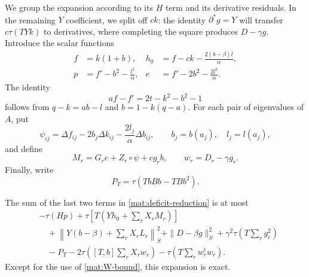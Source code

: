 We group the expansion according to its $H$ term and its derivative
residuals.  In the remaining $Y$ coefficient, we
split off $ck$: the identity $\partial^*g=Y$ will transfer
$c\tau(TYk)$ to derivatives, where completing the square produces
$D-\gamma g$.  Introduce the scalar functions
\begin{equation}\label{mat:scalar-functions}
 \begin{aligned}
 f&=k(1+b),&
 h_0&=f-ck-\frac{2(b-\beta)l}{\alpha},\\
 p&=f'-b^2-\frac{l^2}{\alpha},&
 e&=f'-2b^2-\frac{2l^2}{\alpha}.
 \end{aligned}
\end{equation}
The identity
\[
 af-f'=2t-k^2-b^2-1
\]
follows from $q-k=ab-l$ and $b=1-k(q-a)$.
For each pair of eigenvalues of $A$, put
\[
 \psi_{ij}=\Delta f_{ij}-2b_j\Delta k_{ij}
                         -\frac{2l_j}{\alpha}\Delta b_{ij},
 \qquad b_j=b(a_j),\quad l_j=l(a_j),
\]
and define
\begin{equation}\label{mat:M-w}
 M_r=G_re+Z_r\circ\psi+cg_rb,\qquad w_r=D_r-\gamma g_r.
\end{equation}
Finally, write
\begin{equation}\label{mat:P-definition}
 P_T=\tau(TbBb-TBb^2).
\end{equation}

\begin{lemma}\label{mat:expansion}
The sum of the last two terms in \eqref{mat:deficit-reduction} is at
most
\begin{align}
 &-\tau(Hp)+\tau\left[T\left(Yh_0+\sum_rX_rM_r\right)\right]
       \label{mat:expanded-bound}\\
 &\quad+\left\|Y(b-\beta)+\sum_rX_rL_r\right\|_S^2
       +\|D-\beta g\|_S^2+\gamma^2\tau\left(T\sum_rg_r^2\right)\nonumber\\
 &\quad-P_T-2\tau\left([T,b]\sum_rX_rw_r\right)
                 -\tau\left(T\sum_rw_r^tw_r\right).\nonumber
\end{align}
Except for the use of \eqref{mat:W-bound}, this expansion is exact.
\end{lemma}

